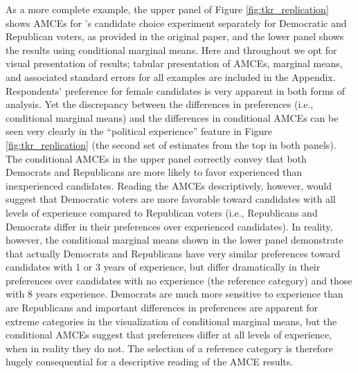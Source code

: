 \documentclass[a4paper,12pt]{article}\usepackage[]{graphicx}\usepackage[]{color}
\begin{document}
As a more complete example, the upper panel of Figure \ref{fig:tkr_replication} shows AMCEs for \citeauthor{TeeleKallaRosenbluth2018}'s candidate choice experiment separately for Democratic and Republican voters, as provided in the original paper, and the lower panel shows the results using conditional marginal means. Here and throughout we opt for visual presentation of results; tabular presentation of AMCEs, marginal means, and associated standard errors for all examples are included in the Appendix. Respondents' preference for female candidates is very apparent in both forms of analysis. Yet the discrepancy between the differences in preferences (i.e., conditional marginal means) and the differences in conditional AMCEs can be seen very clearly in the ``political experience'' feature in Figure \ref{fig:tkr_replication} (the second set of estimates from the top in both panels). The conditional AMCEs in the upper panel correctly convey that both Democrats and Republicans are more likely to favor experienced than inexperienced candidates. Reading the AMCEs descriptively, however, would suggest that Democratic voters are more favorable toward candidates with all levels of experience compared to Republican voters (i.e., Republicans and Democrats differ in their preferences over experienced candidates). In reality, however, the conditional marginal means shown in the lower panel demonstrate that actually Democrats and Republicans have very similar preferences toward candidates with 1 or 3 years of experience, but differ dramatically in their preferences over candidates with no experience (the reference category) and those with 8 years experience. Democrats are much more sensitive to experience than are Republicans and important differences in preferences are apparent for extreme categories in the visualization of conditional marginal means, but the conditional AMCEs suggest that preferences differ at all levels of experience, when in reality they do not. The selection of a reference category is therefore hugely consequential for a descriptive reading of the AMCE results.
\end{document}
